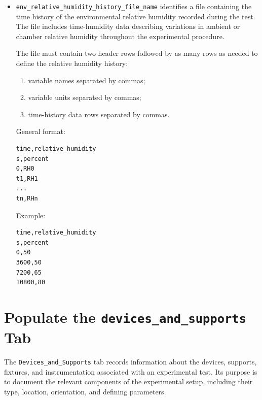 \documentclass[11pt]{book}
\begin{document}
\begin{itemize}
General format:

\begin{verbatim}
time,temperature
s,C
0,T0
t1,T1
...
tn,Tn
\end{verbatim}

Example:

\begin{verbatim}
time,temperature
s,C
0,20
3600,20
7200,35
10800,50
\end{verbatim}

\item \texttt{env\_relative\_humidity\_history\_file\_name} identifies a file containing the time history of the environmental relative humidity recorded during the test. The file includes time-humidity data describing variations in ambient or chamber relative humidity throughout the experimental procedure.

The file must contain two header rows followed by as many rows as needed to define the relative humidity history:

\begin{enumerate}
    \item variable names separated by commas;
    \item variable units separated by commas;
    \item time-history data rows separated by commas.
\end{enumerate}

General format:

\begin{verbatim}
time,relative_humidity
s,percent
0,RH0
t1,RH1
...
tn,RHn
\end{verbatim}

Example:

\begin{verbatim}
time,relative_humidity
s,percent
0,50
3600,50
7200,65
10800,80
\end{verbatim}

\end{itemize}



\section{Populate the \texttt{devices\_and\_supports} Tab}

The \texttt{Devices\_and\_Supports} tab records information about the devices, supports,
fixtures, and instrumentation associated with an experimental test. Its purpose is to document
the relevant components of the experimental setup, including their type, location, orientation,
and defining parameters.
\end{document}
